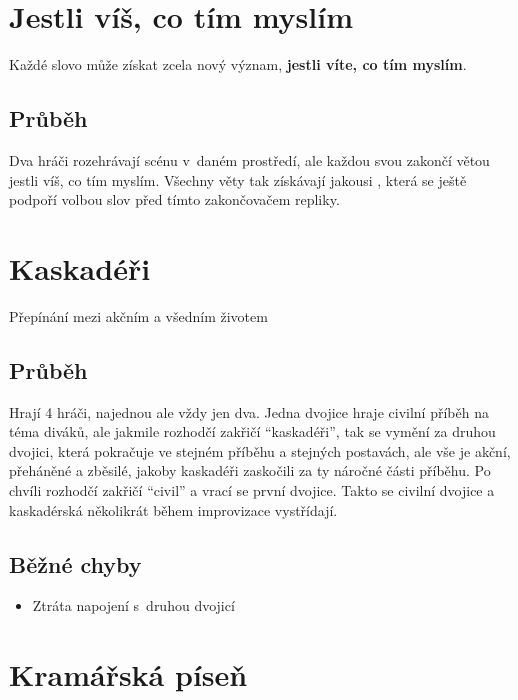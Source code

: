  
 
 
\needspace{5cm} \section{Jestli víš, co tím myslím} \label{jestli víš, co tím myslím}  
 
Každé slovo může získat zcela nový význam, \textbf{jestli víte, co tím myslím}. 
 
\subsection{Průběh} Dva hráči rozehrávají scénu v~daném prostředí, ale každou svou  zakončí  
větou jestli víš, co tím myslím. Všechny věty tak získávají jakousi  , která se ještě podpoří volbou slov před tímto zakončovačem repliky.   
 
 
 
\needspace{5cm} \section{Kaskadéři} \label{kaskadéři}  
 
Přepínání mezi akčním a všedním životem 
 
\subsection{ Průběh }  
Hrají 4 hráči, najednou ale vždy jen dva. Jedna dvojice hraje civilní příběh na téma diváků, ale jakmile rozhodčí zakřičí “kaskadéři”, tak se vymění za druhou dvojici, která pokračuje ve stejném příběhu a stejných postavách, ale vše je akční, přeháněné a zběsilé, jakoby kaskadéři zaskočili za ty náročné části příběhu. Po chvíli rozhodčí zakřičí “civil” a vrací se první dvojice. Takto se civilní dvojice a kaskadérská několikrát během improvizace vystřídají. 
 
\subsection{ Běžné chyby } \begin{itemize}
\item  Ztráta napojení s~druhou dvojicí
\end{itemize}
 
 
 
\needspace{5cm} \section{Kramářská píseň} \label{kramářská píseň}  
 
